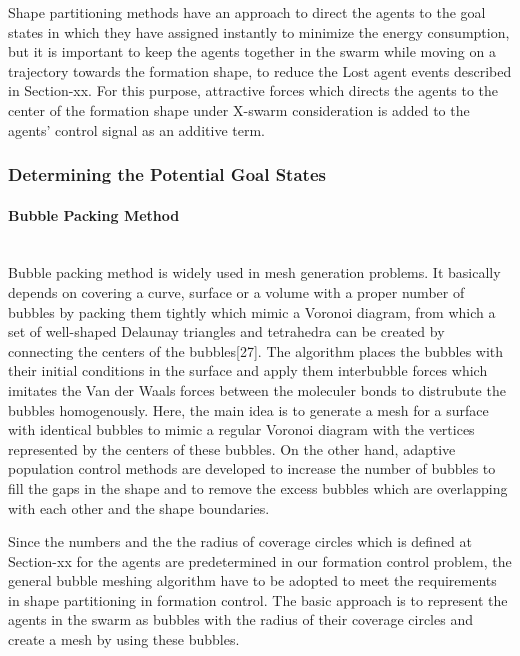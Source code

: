 Shape partitioning methods have an approach to direct the agents to the goal states in which they have assigned instantly to minimize the energy consumption, but it is important to keep the agents together in the swarm while moving on a trajectory towards the formation shape, to reduce the Lost agent events described in Section-xx. For this purpose, attractive forces which directs the agents to the center of the formation shape under X-swarm consideration is added to the agents' control signal as an additive term. 
			
\subsubsection{Determining the Potential Goal States}
\paragraph{Bubble Packing Method} \hspace{0pt} \\				
Bubble packing method is widely used in mesh generation problems. It basically depends on covering a curve, surface or a volume with a proper number of bubbles by packing them tightly which mimic a Voronoi diagram, from which a set of well-shaped Delaunay triangles and tetrahedra can be created by connecting the centers of the bubbles[27].  The algorithm places the bubbles with their initial conditions in the surface and apply them interbubble forces which imitates the Van der Waals forces between the moleculer bonds  to distrubute the bubbles homogenously. Here, the main idea is to generate a mesh for a surface with identical bubbles to mimic a regular Voronoi diagram with the vertices represented by the centers of these bubbles. On the other hand, adaptive population control  methods are developed to increase the number of bubbles to fill the gaps in the shape and to remove the excess bubbles which are overlapping with each other and the shape boundaries. 

Since the numbers and the the radius of coverage circles which is defined at Section-xx for the agents are predetermined in our formation control problem, the general bubble meshing algorithm have to be adopted to meet the requirements in shape partitioning in formation control.  The basic approach is to represent the agents in the swarm as bubbles with the radius of  their coverage circles and create a mesh by using these bubbles. \newline
			
